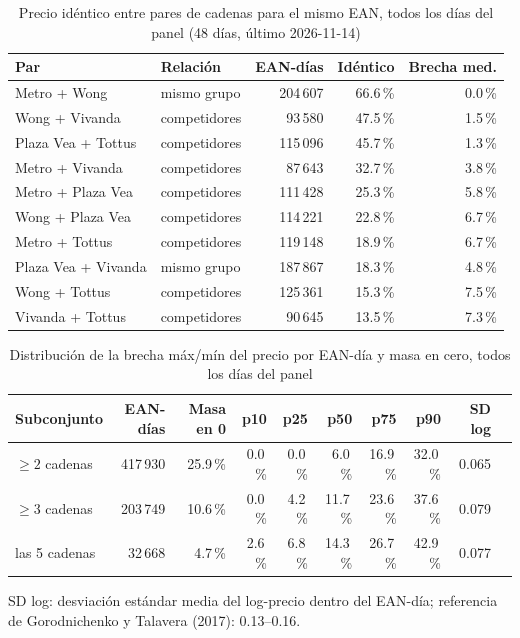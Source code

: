 
\begin{table}[htbp]
\caption{Precio id\'entico entre pares de cadenas para el mismo EAN, todos los d\'ias del panel (48 d\'ias, \'ultimo 2026-11-14)}
\label{tab:identidad}
\centering\scriptsize\setlength{\tabcolsep}{3pt}
\begin{tabular}{@{}llrrr@{}}
\toprule
Par & Relaci\'on & EAN-d\'ias & Id\'entico & Brecha med. \\
\midrule
Metro + Wong & mismo grupo & 204\,607 & 66.6\,\% & 0.0\,\% \\
Wong + Vivanda & competidores & 93\,580 & 47.5\,\% & 1.5\,\% \\
Plaza Vea + Tottus & competidores & 115\,096 & 45.7\,\% & 1.3\,\% \\
Metro + Vivanda & competidores & 87\,643 & 32.7\,\% & 3.8\,\% \\
Metro + Plaza Vea & competidores & 111\,428 & 25.3\,\% & 5.8\,\% \\
Wong + Plaza Vea & competidores & 114\,221 & 22.8\,\% & 6.7\,\% \\
Metro + Tottus & competidores & 119\,148 & 18.9\,\% & 6.7\,\% \\
Plaza Vea + Vivanda & mismo grupo & 187\,867 & 18.3\,\% & 4.8\,\% \\
Wong + Tottus & competidores & 125\,361 & 15.3\,\% & 7.5\,\% \\
Vivanda + Tottus & competidores & 90\,645 & 13.5\,\% & 7.3\,\% \\
\bottomrule\end{tabular}\end{table}

\begin{table}[t]
\caption{Distribuci\'on de la brecha m\'ax/m\'in del precio por EAN-d\'ia y masa en cero, todos los d\'ias del panel}
\label{tab:brecha}
\centering\scriptsize\setlength{\tabcolsep}{4pt}
\begin{tabular}{@{}lrrrrrrrrr@{}}
\toprule
Subconjunto & EAN-d\'ias & Masa en 0 & p10 & p25 & p50 & p75 & p90 & SD log \\
\midrule
$\geq 2$ cadenas & 417\,930 & 25.9\,\% & 0.0\,\% & 0.0\,\% & 6.0\,\% & 16.9\,\% & 32.0\,\% & 0.065 \\
$\geq 3$ cadenas & 203\,749 & 10.6\,\% & 0.0\,\% & 4.2\,\% & 11.7\,\% & 23.6\,\% & 37.6\,\% & 0.079 \\
las 5 cadenas & 32\,668 & 4.7\,\% & 2.6\,\% & 6.8\,\% & 14.3\,\% & 26.7\,\% & 42.9\,\% & 0.077 \\
\bottomrule\end{tabular}
\par\smallskip\raggedright\scriptsize SD log: desviaci\'on est\'andar media del log-precio dentro del EAN-d\'ia; referencia de Gorodnichenko y Talavera (2017): 0.13--0.16.
\end{table}

